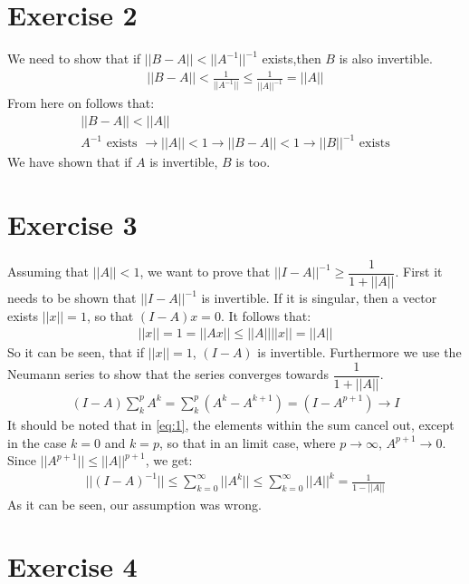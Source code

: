 \section{Exercise 2}
We need to show that if $||B-A|| < {||A^{-1}||^{-1}}$ exists,then $B$ is also invertible.
\begin{gather*}
||B-A|| < \frac{1}{||A^{-1}||} \leq \frac{1}{||A||^{-1}} = ||A||
\end{gather*}
From here on follows that:
\begin{gather*}
||B-A|| < ||A|| \\
A^{-1} \text{ exists } \rightarrow ||A|| < 1 \rightarrow ||B-A|| < 1 \rightarrow ||B||^{-1} \text{ exists}
\end{gather*}
We have shown that if $A$ is invertible, $B$ is too.

\section{Exercise 3}
Assuming that $||A|| < 1$, we want to prove that ${||I-A||}^{-1} \geq \dfrac{1}{1+||A||}$.
First it needs to be shown that ${||I-A||}^{-1}$ is invertible. If it is singular, then a vector exists $||x|| = 1$, so that $(I-A)x=0$.
It follows that:
\begin{gather*}
||x|| = 1 = ||Ax|| \leq ||A|| ||x|| = ||A||
\end{gather*}
So it can be seen, that if $||x|| = 1$, $(I-A)$ is invertible.
Furthermore we use the Neumann series to show that the series converges towards $\dfrac{1}{1+||A||}$.
\begin{gather*}
\label{eq:1}
(I-A) \sum\limits_k^p A^k = \sum\limits_k^p ( A^k - A^{k+1} ) = (I-A^{p+1}) \rightarrow I
\end{gather*}
It should be noted that in \ref{eq:1}, the elements within the sum cancel out, except in the case $k=0$ and $k=p$, so that in an limit case, where $p \rightarrow \infty$, $A^{p+1} \rightarrow 0$.
Since $||A^{p+1} || \leq ||A||^{p+1}$, we get:
\begin{gather*}
\label{eq:2}
||(I-A)^{-1}|| \leq \sum\limits_{k=0}^{\infty} ||A^k|| \leq \sum\limits_{k=0}^{\infty} ||A||^k = 
 \frac{1}{1-||A||}
\end{gather*}
As it can be seen, our assumption was wrong. 

\section{Exercise 4}